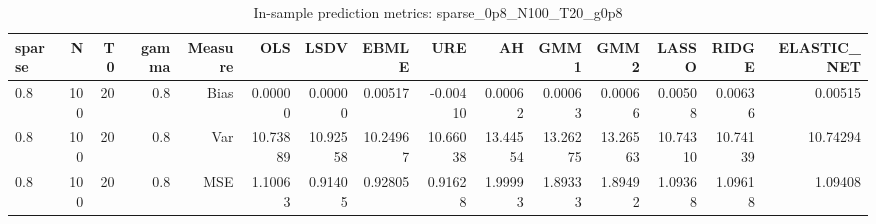 \begin{table}[!htbp]\centering
\caption{In-sample prediction metrics: sparse_0p8_N100_T20_g0p8}
\label{tab:table2_sparse_0p8_N100_T20_g0p8}
\begin{tabular}{lrrrrrrrrrrrrrr}
\hline
sparse & N & T0 & gamma & Measure & OLS & LSDV & EBMLE & URE & AH & GMM1 & GMM2 & LASSO & RIDGE & ELASTIC_NET \\
\hline
0.8 & 100 & 20 & 0.8 & Bias & 0.00000 & 0.00000 & 0.00517 & -0.00410 & 0.00062 & 0.00063 & 0.00066 & 0.00508 & 0.00636 & 0.00515 \\
0.8 & 100 & 20 & 0.8 & Var & 10.73889 & 10.92558 & 10.24967 & 10.66038 & 13.44554 & 13.26275 & 13.26563 & 10.74310 & 10.74139 & 10.74294 \\
0.8 & 100 & 20 & 0.8 & MSE & 1.10063 & 0.91405 & 0.92805 & 0.91628 & 1.99993 & 1.89333 & 1.89492 & 1.09368 & 1.09618 & 1.09408 \\
\hline
\end{tabular}
\end{table}

